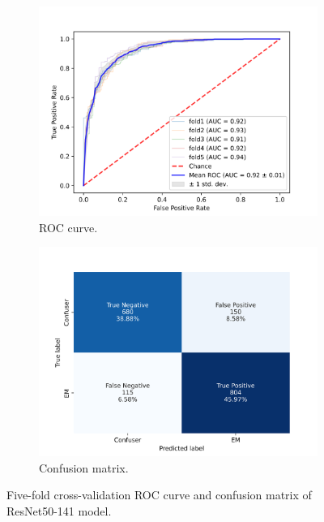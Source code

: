 \begin{figure}[htb!]
	\centering
	\begin{subfigure}[b]{0.49\textwidth}
		\centering
		\includegraphics[width=\textwidth,keepaspectratio]{images/ongoing/ResNet50HAMIMGCOPYWEIGHTEC141DSV2logit_MultiROC.png}
		\caption{ROC curve.}
	\end{subfigure}
	\hfill
	\begin{subfigure}[b]{0.49\textwidth}
		\centering
		\includegraphics[width=\textwidth,keepaspectratio]{images/ongoing/ResNet50HAMIMGCOPYWEIGHTEC141DSV2logit_Combined_CM.png}
		\caption{Confusion matrix.}
	\end{subfigure}
	\caption{Five-fold cross-validation ROC curve and confusion matrix of ResNet50-141 model.}
\end{figure}
\resumetocwriting